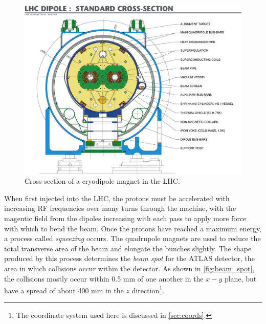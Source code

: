 \begin{centering}
\begin{figure}[!hbt]
\myfloatalign
\includegraphics[width=.90\linewidth]{figures/lhc/magnet.jpg}
\caption{Cross-section of a cryodipole magnet in the \ac{LHC}.}
\label{fig:magnet}
\end{figure}
\end{centering}

When first injected into the \ac{LHC}, the protons must be accelerated with increasing \ac{RF} frequencies over many turns through the machine, with the magentic field from the dipoles increasing with each pass to apply more force with which to bend the beam. Once the protons have reached a maximum energy, a process called \textit{squeezing} occurs. The quadrupole magnets are used to reduce the total transverse area of the beam and elongate the bunches slightly. The shape produced by this process determines the \textit{beam spot} for the \ac{ATLAS} detector, the area in which collisions occur within the detector. As shown in \autoref{fig:beam_spot}, the collisions mostly occur within 0.5 mm of one another in the $x-y$ plane, but have a spread of about 400 mm in the $z$ direction\footnote{The coordinate system used here is discussed in \autoref{sec:coords}.}.

